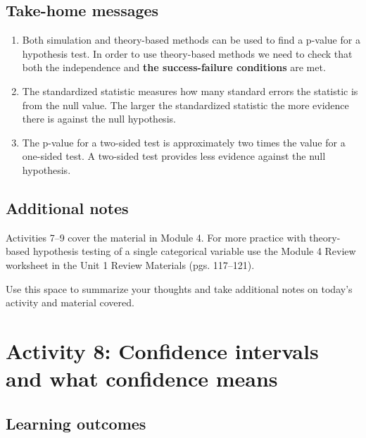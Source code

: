 \documentclass[
]{report}
\begin{document}
\vspace{0.2in}

\subsection{Take-home messages}\label{take-home-messages-6}

\begin{enumerate}
\def\labelenumi{\arabic{enumi}.}
\item
  Both simulation and theory-based methods can be used to find a p-value for a hypothesis test. In order to use theory-based methods we need to check that both the independence and \textbf{the success-failure conditions} are met.
\item
  The standardized statistic measures how many standard errors the statistic is from the null value. The larger the standardized statistic the more evidence there is against the null hypothesis.
\item
  The p-value for a two-sided test is approximately two times the value for a one-sided test. A two-sided test provides less evidence against the null hypothesis.
\end{enumerate}

\subsection{Additional notes}\label{additional-notes-6}

Activities 7--9 cover the material in Module 4. For more practice with theory-based hypothesis testing of a single categorical variable use the Module 4 Review worksheet in the Unit 1 Review Materials (pgs. 117--121).

Use this space to summarize your thoughts and take additional notes on today's activity and material covered.

\newpage

\section{Activity 8: Confidence intervals and what confidence means}\label{activity-8-confidence-intervals-and-what-confidence-means}


\subsection{Learning outcomes}\label{learning-outcomes-7}
\end{document}
